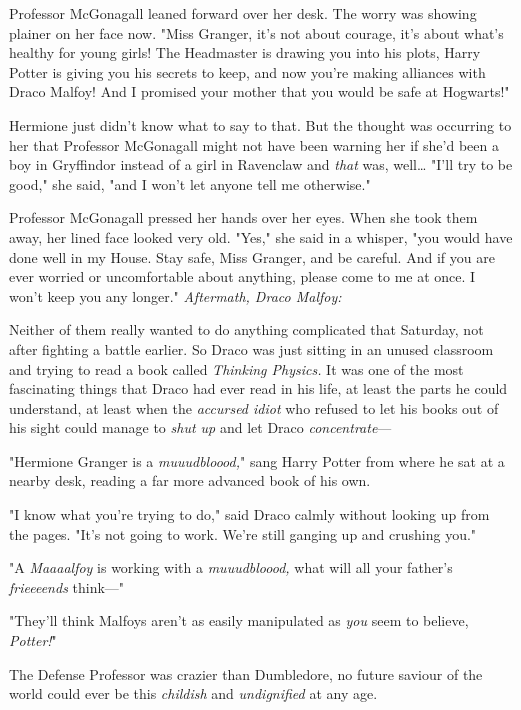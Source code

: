 Professor McGonagall leaned forward over her desk. The worry was showing 
plainer on her face now. "Miss Granger, it's not about courage, it's about 
what's healthy for young girls! The Headmaster is drawing you into his plots, 
Harry Potter is giving you his secrets to keep, and now you're making alliances 
with Draco Malfoy! And I promised your mother that you would be safe at 
Hogwarts!"

Hermione just didn't know what to say to that. But the thought was occurring to 
her that Professor McGonagall might not have been warning her if she'd been a 
boy in Gryffindor instead of a girl in Ravenclaw and \emph{that} was, 
well{\ldots} "I'll try to be good," she said, "and I won't let anyone tell me 
otherwise."

Professor McGonagall pressed her hands over her eyes. When she took them away, 
her lined face looked very old. "Yes," she said in a whisper, "you would have 
done well in my House. Stay safe, Miss Granger, and be careful. And if you are 
ever worried or uncomfortable about anything, please come to me at once. I 
won't keep you any longer."
\sbreak
\emph{Aftermath, Draco Malfoy:}

Neither of them really wanted to do anything complicated that Saturday, not 
after fighting a battle earlier. So Draco was just sitting in an unused 
classroom and trying to read a book called \emph{Thinking Physics.} It was one 
of the most fascinating things that Draco had ever read in his life, at least 
the parts he could understand, at least when the \emph{accursed idiot} who 
refused to let his books out of his sight could manage to \emph{shut up} and 
let Draco \emph{concentrate}---

"Hermione Granger is a \emph{muuudbloood,}" sang Harry Potter from where he sat 
at a nearby desk, reading a far more advanced book of his own.

"I know what you're trying to do," said Draco calmly without looking up from 
the pages. "It's not going to work. We're still ganging up and crushing you."

"A \emph{Maaaalfoy} is working with a \emph{muuudbloood,} what will all your 
father's \emph{frieeeends} think---"

"They'll think Malfoys aren't as easily manipulated as \emph{you} seem to 
believe, \emph{Potter!}"

The Defense Professor was crazier than Dumbledore, no future saviour of the 
world could ever be this \emph{childish} and \emph{undignified} at any age.

